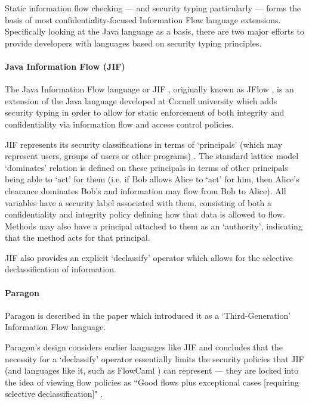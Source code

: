 Static information flow checking --- and security typing particularly --- forms the basis of most confidentiality-focused Information Flow language extensions. Specifically looking at the Java language as a basis, there are two major efforts to provide developers with languages based on security typing principles.

\paragraph{Java Information Flow (JIF)}

The Java Information Flow language or JIF \cite{myers2006jif}, originally known as JFlow \cite{myers1999jif}, is an extension of the Java language developed at Cornell university which adds security typing in order to allow for static enforcement of both integrity and confidentiality via information flow and access control policies.

JIF represents its security classifications in terms of `principals' (which may represent users, groups of users or other programs) \cite{pullicino2014jif}. The standard lattice model `dominates' relation is defined on these principals in terms of other principals being able to `act' for them (i.e. if Bob allows Alice to `act' for him, then Alice's clearance dominates Bob's and information may flow from Bob to Alice). All variables have a security label associated with them, consisting of both a confidentiality and integrity policy defining how that data is allowed to flow. Methods may also have a principal attached to them as an `authority', indicating that the method acts for that principal.

JIF also provides an explicit `declassify' operator which allows for the selective declassification of information.

\paragraph{Paragon}

Paragon is described in the paper which introduced it \cite{broberg2013paragon} as a `Third-Generation' Information Flow language.

Paragon's design considers earlier languages like JIF and concludes that the necessity for a `declassify' operator essentially limits the security policies that JIF (and languages like it, such as FlowCaml \cite{simonet2003flow}) can represent --- they are locked into the idea of viewing flow policies as ``Good flows plus exceptional cases [requiring selective declassification]" \cite{broberg2013paragon}.

